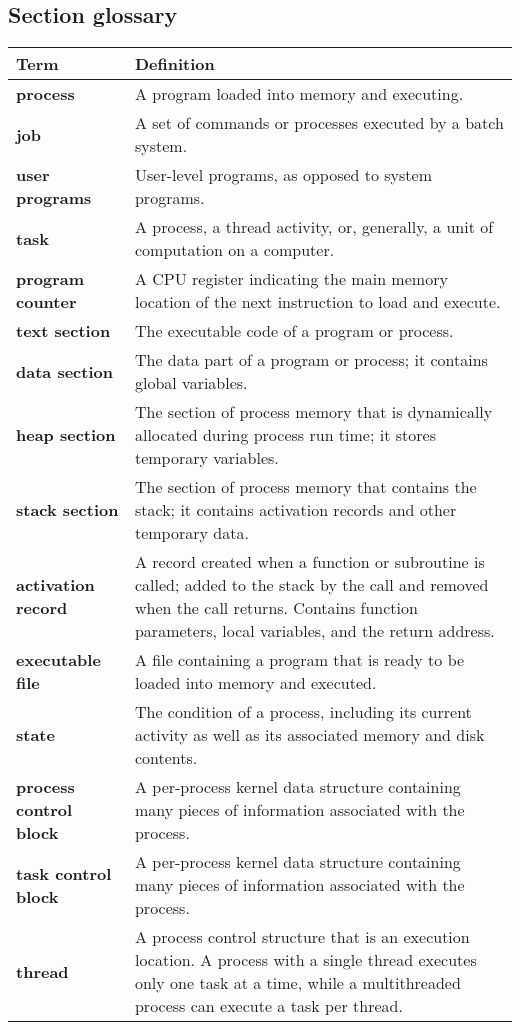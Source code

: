 \subsection*{Section glossary}
\centering
\begin{tabular}{>{\raggedright}p{} >{\raggedright\arraybackslash}p{}}
\toprule
\textbf{Term} & \textbf{Definition} \\
\midrule
\textbf{process} & A program loaded into memory and executing. \\
\textbf{job} & A set of commands or processes executed by a batch system. \\
\textbf{user programs} & User-level programs, as opposed to system programs. \\
\textbf{task} & A process, a thread activity, or, generally, a unit of computation on a computer. \\
\textbf{program counter} & A CPU register indicating the main memory location of the next instruction to load and execute. \\
\textbf{text section} & The executable code of a program or process. \\
\textbf{data section} & The data part of a program or process; it contains global variables. \\
\textbf{heap section} & The section of process memory that is dynamically allocated during process run time; it stores temporary variables. \\
\textbf{stack section} & The section of process memory that contains the stack; it contains activation records and other temporary data. \\
\textbf{activation record} & A record created when a function or subroutine is called; added to the stack by the call and removed when the call returns. Contains function parameters, local variables, and the return address. \\
\textbf{executable file} & A file containing a program that is ready to be loaded into memory and executed. \\
\textbf{state} & The condition of a process, including its current activity as well as its associated memory and disk contents. \\
\textbf{process control block} & A per-process kernel data structure containing many pieces of information associated with the process. \\
\textbf{task control block} & A per-process kernel data structure containing many pieces of information associated with the process. \\
\textbf{thread} & A process control structure that is an execution location. A process with a single thread executes only one task at a time, while a multithreaded process can execute a task per thread. \\
\bottomrule
\end{tabular}
\vspace{\baselineskip}
